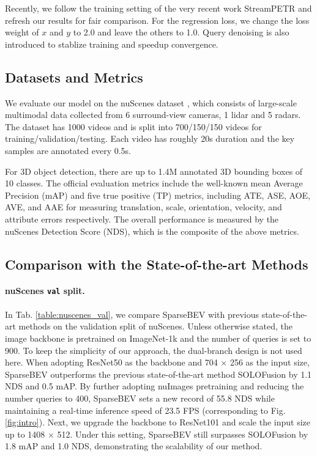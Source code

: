 \documentclass[10pt,twocolumn,letterpaper]{article}
\begin{document}
Recently, we follow the training setting of the very recent work StreamPETR \cite{streampetr} and refresh our results for fair comparison. For the regression loss, we change the loss weight of $x$ and $y$ to 2.0 and leave the others to 1.0. Query denoising \cite{dndetr} is also introduced to stablize training and speedup convergence.

\subsection{Datasets and Metrics}

We evaluate our model on the nuScenes dataset \cite{nuscenes}, which consists of large-scale multimodal data collected from 6 surround-view cameras, 1 lidar and 5 radars. The dataset has 1000 videos and is split into 700/150/150 videos for training/validation/testing. Each video has roughly 20s duration and the key samples are annotated every 0.5s.

For 3D object detection, there are up to 1.4M annotated 3D bounding boxes of 10 classes. The official evaluation metrics include the well-known mean Average Precision (mAP) and five true positive (TP) metrics, including ATE, ASE, AOE, AVE, and AAE for measuring translation, scale, orientation, velocity, and attribute errors respectively. The overall performance is measured by the nuScenes Detection Score (NDS), which is the composite of the above metrics.

\subsection{Comparison with the State-of-the-art Methods}

\paragraph{nuScenes \texttt{val} split.} In Tab. \ref{table:nuscenes_val}, we compare SparseBEV with previous state-of-the-art methods on the validation split of nuScenes.
Unless otherwise stated, the image backbone is pretrained on ImageNet-1k \cite{imagenet} and the number of queries is set to 900.
To keep the simplicity of our approach, the dual-branch design is not used here.
When adopting ResNet50 as the backbone and 704 $\times$ 256 as the input size, SparseBEV outperforms the previous state-of-the-art method SOLOFusion by 1.1 NDS and 0.5 mAP.
By further adopting nuImages \cite{nuscenes} pretraining and reducing the number queries to 400, SparseBEV sets a new record of 55.8 NDS while maintaining a real-time inference speed of 23.5 FPS (corresponding to Fig. \ref{fig:intro}).
Next, we upgrade the backbone to ResNet101 and scale the input size up to 1408 $\times$ 512.
Under this setting, SparseBEV still surpasses SOLOFusion by 1.8 mAP and 1.0 NDS, demonstrating the scalability of our method.
\end{document}

